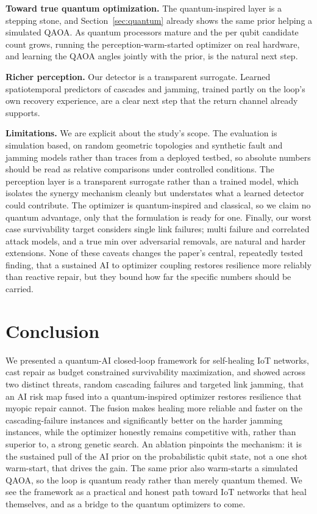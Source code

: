 \documentclass[journal]{IEEEtran}
\begin{document}
\noindent\textbf{Toward true quantum optimization.} The quantum-inspired layer is a stepping stone, and Section~\ref{sec:quantum} already shows the same prior helping a simulated QAOA. As quantum processors mature and the per qubit candidate count grows, running the perception-warm-started optimizer on real hardware, and learning the QAOA angles jointly with the prior, is the natural next step.

\noindent\textbf{Richer perception.} Our detector is a transparent surrogate. Learned spatiotemporal predictors of cascades and jamming, trained partly on the loop's own recovery experience, are a clear next step that the return channel already supports.

\noindent\textbf{Limitations.} We are explicit about the study's scope. The evaluation is simulation based, on random geometric topologies and synthetic fault and jamming models rather than traces from a deployed testbed, so absolute numbers should be read as relative comparisons under controlled conditions. The perception layer is a transparent surrogate rather than a trained model, which isolates the synergy mechanism cleanly but understates what a learned detector could contribute. The optimizer is quantum-inspired and classical, so we claim no quantum advantage, only that the formulation is ready for one. Finally, our worst case survivability target considers single link failures; multi failure and correlated attack models, and a true min over adversarial removals, are natural and harder extensions. None of these caveats changes the paper's central, repeatedly tested finding, that a sustained AI to optimizer coupling restores resilience more reliably than reactive repair, but they bound how far the specific numbers should be carried.

\section{Conclusion}\label{sec:conclusion}

We presented a quantum-AI closed-loop framework for self-healing IoT networks, cast repair as budget constrained survivability maximization, and showed across two distinct threats, random cascading failures and targeted link jamming, that an AI risk map fused into a quantum-inspired optimizer restores resilience that myopic repair cannot. The fusion makes healing more reliable and faster on the cascading-failure instances and significantly better on the harder jamming instances, while the optimizer honestly remains competitive with, rather than superior to, a strong genetic search. An ablation pinpoints the mechanism: it is the sustained pull of the AI prior on the probabilistic qubit state, not a one shot warm-start, that drives the gain. The same prior also warm-starts a simulated QAOA, so the loop is quantum ready rather than merely quantum themed. We see the framework as a practical and honest path toward IoT networks that heal themselves, and as a bridge to the quantum optimizers to come.
\end{document}
